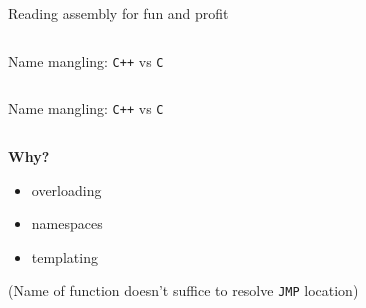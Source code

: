\begin{frame}[fragile]{Reading assembly for fun and profit}
    \begin{columns}[t]
        \begin{column}{.45\textwidth}
        \end{column}
        \begin{column}{.45\textwidth}
        \end{column}
    \end{columns}
\end{frame}

\begin{frame}[fragile]{Name mangling: \texttt{C++} vs \texttt{C}}
    \begin{columns}[t]
        \begin{column}{.45\textwidth}
        \end{column}
        \begin{column}{.45\textwidth}
        \end{column}
    \end{columns}
\end{frame}

\begin{frame}[fragile]{Name mangling: \texttt{C++} vs \texttt{C}}
    \begin{columns}[t]
        \begin{column}{.45\textwidth}

                \textbf{Why?}
                \begin{itemize}
                    \item overloading
                    \item namespaces
                    \item templating
                \end{itemize}
                (Name of function doesn't suffice to resolve \texttt{JMP} location)%
        \end{column}
        \begin{column}{.45\textwidth}
        \end{column}
    \end{columns}
\end{frame}

